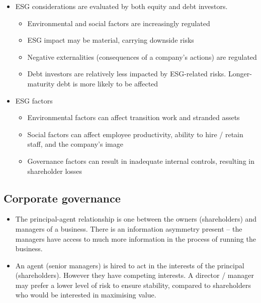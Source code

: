 \documentclass[../notes_compiled.tex]{subfiles}
\begin{document}
\begin{itemize}
\item ESG considerations are evaluated by both equity and debt investors.
\begin{itemize}
\item Environmental and social factors are increasingly regulated
\item ESG impact may be material, carrying downside risks
\item Negative externalities (consequences of a company's actions) are regulated
\item Debt investors are relatively less impacted by ESG-related risks. Longer-maturity debt is more likely to be affected
\end{itemize}
\item ESG factors
\begin{itemize}
\item Environmental factors can affect transition work and stranded assets
\item Social factors can affect employee productivity, ability to hire / retain staff, and the company's image
\item Governance factors can result in inadequate internal controls, resulting in shareholder losses
\end{itemize}
\end{itemize}

\subsection{Corporate governance}
\begin{itemize}
\item The principal-agent relationship is one between the owners (shareholders) and managers of a business. There is an information asymmetry present -- the managers have access to much more information in the process of running the business. 
\item An agent (senior managers) is hired to act in the interests of the principal (shareholders). However they have competing interests. A director / manager may prefer a lower level of risk to ensure stability, compared to shareholders who would be interested in maximising value.
\end{itemize}
\end{document}

